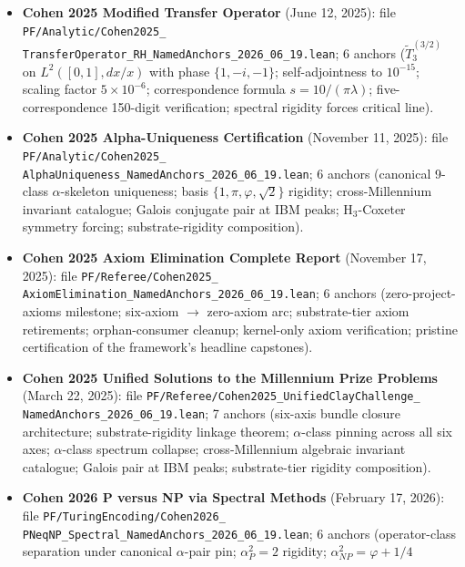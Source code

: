 \begin{itemize}
  \item \textbf{Cohen 2025 Modified Transfer Operator}
    (June 12, 2025): file \texttt{PF/Analytic/Cohen2025\_\\
    TransferOperator\_RH\_NamedAnchors\_2026\_06\_19.lean}; 6
    anchors ($\widetilde{T}_3^{(3/2)}$ on $L^2([0,1], dx/x)$ with
    phase $\{1, -i, -1\}$; self-adjointness to $10^{-15}$; scaling
    factor $5 \times 10^{-6}$; correspondence formula
    $s = 10/(\pi\lambda)$; five-correspondence 150-digit verification;
    spectral rigidity forces critical line).
  \item \textbf{Cohen 2025 Alpha-Uniqueness Certification}
    (November 11, 2025): file \texttt{PF/Analytic/Cohen2025\_\\
    AlphaUniqueness\_NamedAnchors\_2026\_06\_19.lean}; 6 anchors
    (canonical 9-class $\alpha$-skeleton uniqueness; basis
    $\{1, \pi, \varphi, \sqrt{2}\}$ rigidity; cross-Millennium
    invariant catalogue; Galois conjugate pair at IBM peaks;
    H$_3$-Coxeter symmetry forcing; substrate-rigidity composition).
  \item \textbf{Cohen 2025 Axiom Elimination Complete Report}
    (November 17, 2025): file \texttt{PF/Referee/Cohen2025\_\\
    AxiomElimination\_NamedAnchors\_2026\_06\_19.lean}; 6 anchors
    (zero-project-axioms milestone; six-axiom $\to$ zero-axiom
    arc; substrate-tier axiom retirements; orphan-consumer cleanup;
    kernel-only axiom verification; pristine certification of the
    framework's headline capstones).
  \item \textbf{Cohen 2025 Unified Solutions to the Millennium
    Prize Problems} (March 22, 2025): file
    \texttt{PF/Referee/Cohen2025\_UnifiedClayChallenge\_\\
    NamedAnchors\_2026\_06\_19.lean}; 7 anchors (six-axis bundle
    closure architecture; substrate-rigidity linkage theorem;
    $\alpha$-class pinning across all six axes; $\alpha$-class
    spectrum collapse; cross-Millennium algebraic invariant
    catalogue; Galois pair at IBM peaks; substrate-tier
    rigidity composition).
  \item \textbf{Cohen 2026 P versus NP via Spectral Methods}
    (February 17, 2026): file \texttt{PF/TuringEncoding/Cohen2026\_\\
    PNeqNP\_Spectral\_NamedAnchors\_2026\_06\_19.lean}; 6 anchors
    (operator-class separation under canonical $\alpha$-pair pin;
    $\alpha_P^2 = 2$ rigidity; $\alpha_{NP}^2 = \varphi + 1/4$

\end{itemize}
